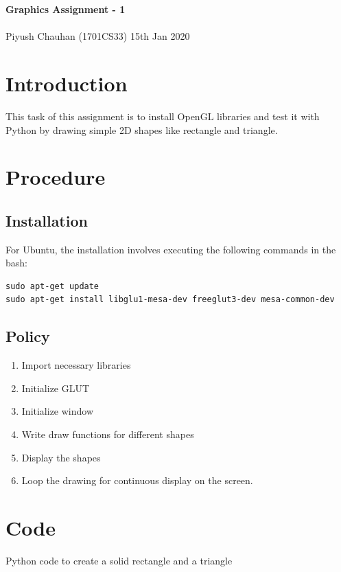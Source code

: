 \documentclass[a4paper, 11pt]{article}
\begin{document}
	\noindent
	{\Huge\textbf{Graphics Assignment - 1}} \\ \\
	\Large Piyush Chauhan (1701CS33)  \hfill 15th Jan 2020\\ 

	
	\section*{Introduction}
	This task of this assignment is to install OpenGL libraries and test it with Python by drawing simple 2D shapes like rectangle and triangle.


	\section*{Procedure}
	\subsection*{Installation}
	For Ubuntu, the installation involves executing the following commands in the bash:
	\begin{lstlisting}
sudo apt-get update
sudo apt-get install libglu1-mesa-dev freeglut3-dev mesa-common-dev
	\end{lstlisting}

	\subsection*{Policy}
	\begin{enumerate}
		\item Import necessary libraries
		\item Initialize GLUT
		\item Initialize window
		\item Write draw functions for different shapes
		\item Display the shapes 
		\item Loop the drawing for continuous display on the screen. 
	\end{enumerate}

	\section*{Code}
	Python code to create a solid rectangle and a triangle
\end{document}
